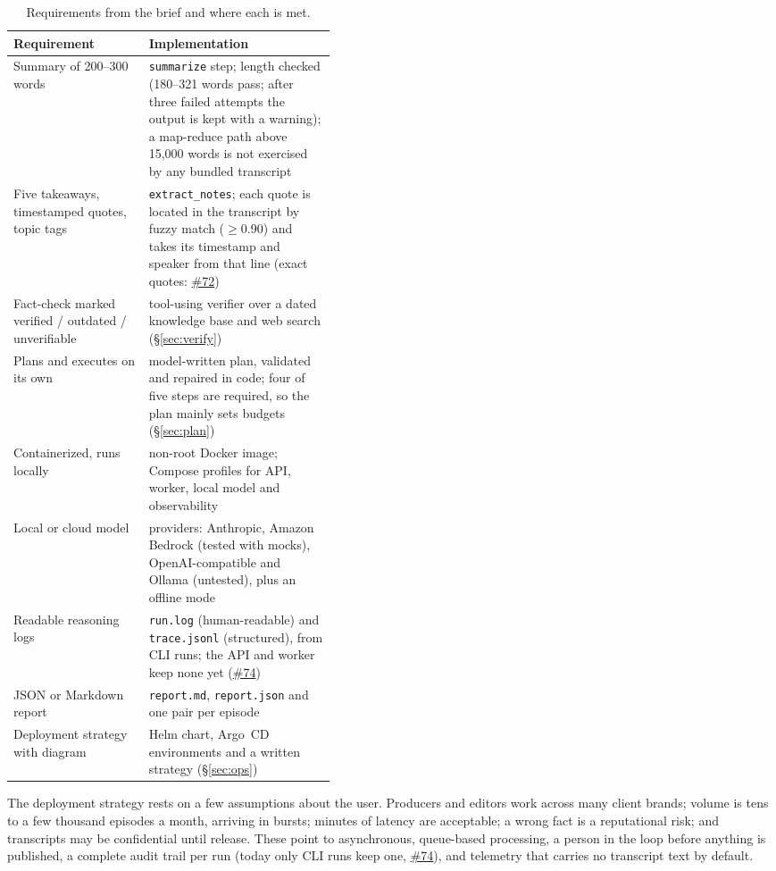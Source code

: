 \documentclass[11pt]{article}
\newcommand{\code}[1]{\texttt{#1}}
\newcommand{\gh}[1]{\href{https://github.com/Organized-AI/podcast-agent/issues/#1}{\##1}}
\begin{document}
\begin{table}[t]
\centering\small
\caption{Requirements from the brief and where each is met.}\label{tab:reqs}
\begin{tabularx}{\linewidth}{@{}>{\raggedright\arraybackslash}p{0.42\linewidth}X@{}}
\toprule
Requirement & Implementation \\
\midrule
Summary of 200--300 words & \code{summarize} step; length checked (180--321 words pass; after three failed attempts the output is kept with a warning); a map-reduce path above 15{,}000 words is not exercised by any bundled transcript \\
Five takeaways, timestamped quotes, topic tags & \code{extract\_notes}; each quote is located in the transcript by fuzzy match ($\ge$0.90) and takes its timestamp and speaker from that line (exact quotes: \gh{72}) \\
Fact-check marked verified / outdated / unverifiable & tool-using verifier over a dated knowledge base and web search (\S\ref{sec:verify}) \\
Plans and executes on its own & model-written plan, validated and repaired in code; four of five steps are required, so the plan mainly sets budgets (\S\ref{sec:plan}) \\
Containerized, runs locally & non-root Docker image; Compose profiles for API, worker, local model and observability \\
Local or cloud model & providers: Anthropic, Amazon Bedrock (tested with mocks), OpenAI-compatible and Ollama (untested), plus an offline mode \\
Readable reasoning logs & \code{run.log} (human-readable) and \code{trace.jsonl} (structured), from CLI runs; the API and worker keep none yet (\gh{74}) \\
JSON or Markdown report & \code{report.md}, \code{report.json} and one pair per episode \\
Deployment strategy with diagram & Helm chart, Argo~CD environments and a written strategy (\S\ref{sec:ops}) \\
\bottomrule
\end{tabularx}
\end{table}

The deployment strategy rests on a few assumptions about the user. Producers and editors work across many client brands; volume is tens to a few thousand episodes a month, arriving in bursts; minutes of latency are acceptable; a wrong fact is a reputational risk; and transcripts may be confidential until release. These point to asynchronous, queue-based processing, a person in the loop before anything is published, a complete audit trail per run (today only CLI runs keep one, \gh{74}), and telemetry that carries no transcript text by default.
\end{document}
